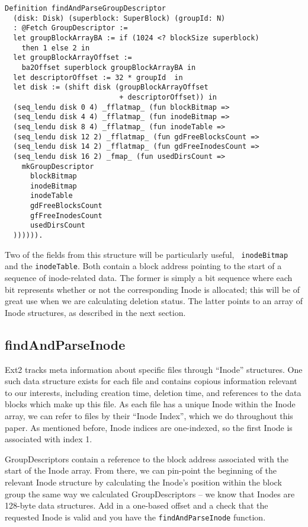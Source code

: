 \documentclass[nocopyrightspace,preprint]{sigplanconf}
\begin{document}
\begin{lstlisting}
Definition findAndParseGroupDescriptor 
  (disk: Disk) (superblock: SuperBlock) (groupId: N)
  : @Fetch GroupDescriptor :=
  let groupBlockArrayBA := if (1024 <? blockSize superblock)
    then 1 else 2 in
  let groupBlockArrayOffset := 
    ba2Offset superblock groupBlockArrayBA in
  let descriptorOffset := 32 * groupId  in
  let disk := (shift disk (groupBlockArrayOffset 
                           + descriptorOffset)) in
  (seq_lendu disk 0 4) _fflatmap_ (fun blockBitmap =>
  (seq_lendu disk 4 4) _fflatmap_ (fun inodeBitmap =>
  (seq_lendu disk 8 4) _fflatmap_ (fun inodeTable =>
  (seq_lendu disk 12 2) _fflatmap_ (fun gdFreeBlocksCount =>
  (seq_lendu disk 14 2) _fflatmap_ (fun gdFreeInodesCount =>
  (seq_lendu disk 16 2) _fmap_ (fun usedDirsCount =>
    mkGroupDescriptor
      blockBitmap
      inodeBitmap
      inodeTable
      gdFreeBlocksCount
      gfFreeInodesCount
      usedDirsCount
  )))))).
\end{lstlisting}

Two of the fields from this structure will be particularly useful, {\tt
inodeBitmap} and the {\tt inodeTable}. Both contain a block address pointing
to the start of a sequence of inode-related data. The former is simply a bit
sequence where each bit represents whether or not the corresponding Inode is
allocated; this will be of great use when we are calculating deletion status.
The latter points to an array of Inode structures, as described in the next
section.

\subsection{findAndParseInode}

Ext2 tracks meta information about specific files through ``Inode''
structures. One such data structure exists for each file and contains copious
information relevant to our interests, including creation time, deletion time,
and references to the data blocks which make up this file. As each file has a
unique Inode within the Inode array, we can refer to files by their ``Inode
Index'', which we do throughout this paper. As mentioned before, Inode indices
are one-indexed, so the first Inode is associated with index 1.

GroupDescriptors contain a reference to the block address associated with the
start of the Inode array. From there, we can pin-point the beginning of the
relevant Inode structure by calculating the Inode's position within the block
group the same way we calculated GroupDescriptors -- we know that Inodes are
128-byte data structures.  Add in a one-based offset and a check that the
requested Inode is valid and you have the {\tt findAndParseInode} function.
\end{document}
